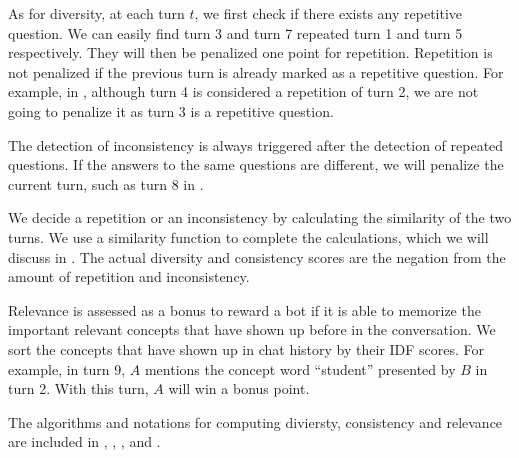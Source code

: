 As for diversity, at each turn $t$, we first check if there exists any repetitive question.  
We can easily find turn 3 and turn 7 repeated turn 1 and turn 5 
respectively. They will then be penalized one point for repetition. 
Repetition is not penalized if the previous turn is already 
marked as a repetitive question. For example, in , 
although turn 4 is considered a repetition of turn 2,  
we are not going to penalize it as turn 3 is a repetitive question. 

The detection of inconsistency is always triggered after the detection of repeated questions. 
If the answers to the same questions are different, we will penalize the current turn, 
such as turn 8 in .

We decide a repetition or an inconsistency by calculating the similarity of the two turns. 
We use a similarity function to complete the calculations, which we will 
discuss in . The actual diversity and consistency scores
are the negation from the amount of repetition and inconsistency.

Relevance is assessed as a bonus to reward
a bot if it is able to memorize the important relevant concepts that have shown up 
before in the conversation. We sort the concepts that have shown up in 
chat history by their IDF scores. For example, in turn 9, $A$ 
mentions the concept word ``student'' presented by $B$ in turn 2. With this
turn, $A$ will win a bonus point.


The algorithms and notations for computing diviersty, consistency and relevance are included
in , , , and . 

